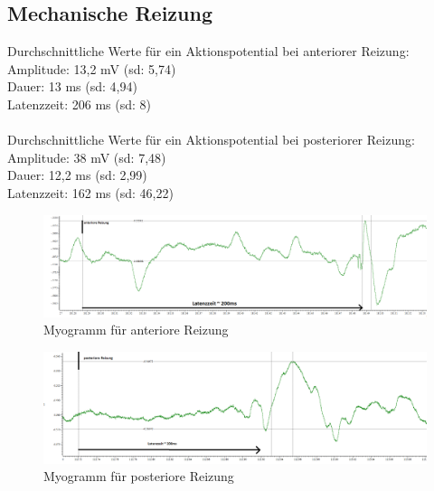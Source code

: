 \documentclass[a4paper]{article}
\begin{document}
\subsection{Mechanische Reizung}
Durchschnittliche Werte für ein Aktionspotential bei anteriorer Reizung: \\
Amplitude: 13,2 mV (sd: 5,74)\\
Dauer: 13 ms (sd: 4,94)\\
Latenzzeit: 206 ms (sd: 8)\\ \\
Durchschnittliche Werte für ein Aktionspotential bei posteriorer Reizung: \\
Amplitude: 38 mV (sd: 7,48)\\
Dauer: 12,2 ms (sd: 2,99)\\
Latenzzeit: 162 ms (sd: 46,22)\\

\begin{figure}[H]
    \centering
        \includegraphics[width=\textwidth]{images/Exp2_aR.png}
    \caption{Myogramm für anteriore Reizung}
\end{figure}
\begin{figure}[H]
    \centering
        \includegraphics[width=\textwidth]{images/Exp2_pR.png}
    \caption{Myogramm für posteriore Reizung}
\end{figure}
\end{document}
